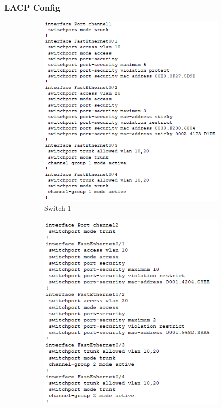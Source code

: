 \subsubsection{LACP Config}
\begin{figure}[!htb]
    \centering
    \begin{subfigure}{.45\textwidth}
        \includegraphics[width=\textwidth,height=\textwidth,keepaspectratio]{./img/lacp/S1.png}
        \caption{Switch 1}
    \end{subfigure}
    \begin{subfigure}{.45\textwidth}
        \includegraphics[width=\textwidth,height=\textwidth,keepaspectratio]{./img/lacp/S2.png}

\end{subfigure}
\end{figure}
